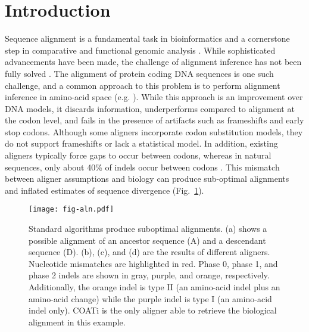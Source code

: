 \section*{Introduction}

Sequence alignment is a fundamental task in bioinformatics and a cornerstone step in comparative and functional genomic analysis . While sophisticated advancements have been made, the challenge of alignment inference has not been fully solved .
%
The alignment of protein coding DNA sequences is one such challenge, and a common approach to this problem is to perform alignment inference in amino-acid space (e.g. ).
While this approach is an improvement over DNA models, it discards information, underperforms compared to alignment at the codon level, and fails in the presence of artifacts such as frameshifts and early stop codons.
Although some aligners incorporate codon substitution models, they do not support frameshifts or lack a statistical model.
In addition, existing aligners typically force gaps to occur between codons, whereas in natural sequences, only about 40\% of indels occur between codons .
This mismatch between aligner assumptions and biology can produce sub-optimal alignments and inflated estimates of sequence divergence (Fig.\ \ref{fig:aln}).

\begin{figure}[h!]
    \centering%
    \texttt{[image: fig-aln.pdf]}
    \par
    \caption{
        Standard algorithms produce suboptimal alignments.
        (a) shows a possible alignment of an ancestor sequence (A) and a descendant sequence (D).
        (b), (c), and (d) are the results of different aligners.
        Nucleotide mismatches are highlighted in red. Phase 0, phase 1, and phase 2 indels are shown in gray, purple, and orange, respectively.
        Additionally, the orange indel is type II (an amino-acid indel plus an amino-acid change) while the purple indel is type I (an amino-acid indel only).
        COATi is the only aligner able to retrieve the biological alignment in this example.
        }
    \label{fig:aln}
\end{figure}

